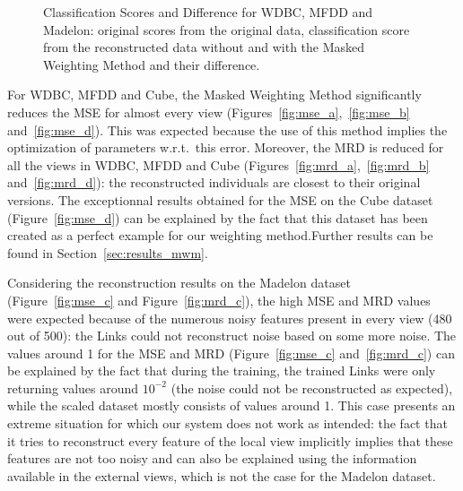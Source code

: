 \begin{figure}[H]
    \quad
    \caption{Classification Scores and Difference for WDBC, MFDD and
        Madelon: original scores from the original data, classification score from the reconstructed data without and with the Masked Weighting Method and their difference.}
\end{figure}

For WDBC, MFDD and Cube, the Masked Weighting Method significantly reduces the MSE for almost every view (Figures~\ref{fig:mse_a},~\ref{fig:mse_b} and~\ref{fig:mse_d}). This was expected because the use of this method implies the optimization of parameters w.r.t.\ this error. Moreover, the MRD is reduced for all the views in WDBC, MFDD and Cube (Figures~\ref{fig:mrd_a},~\ref{fig:mrd_b} and~\ref{fig:mrd_d}): the reconstructed individuals are closest to their original versions. The exceptionnal results obtained for the MSE on the Cube dataset (Figure~\ref{fig:mse_d}) can be explained by the fact that this dataset has been created as a perfect example for our weighting method.\@ Further results can be found in Section~\ref{sec:results_mwm}.

Considering the reconstruction results on the Madelon dataset (Figure~\ref{fig:mse_c} and Figure~\ref{fig:mrd_c}), the high MSE and MRD values were expected because of the numerous noisy features present in every view (480 out of 500): the Links could not reconstruct noise based on some more noise. The values around 1 for the MSE and MRD (Figure~\ref{fig:mse_c} and~\ref{fig:mrd_c}) can be explained by the fact that during the training, the trained Links were only returning values around $10^{-2}$ (the noise could not be reconstructed as expected), while the scaled dataset mostly consists of values around 1. This case presents an extreme situation for which our system does not work as intended: the fact that it tries to reconstruct every feature of the local view implicitly implies that these features are not too noisy and can also be explained using the information available in the external views, which is not the case for the Madelon dataset.
	

